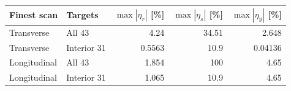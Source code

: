 \begin{tabular}{llrrr}
\toprule
Finest scan & Targets & $\max|\eta_r|$ [\%] & $\max|\eta_s|$ [\%] & $\max|\eta_y|$ [\%] \\
\midrule
Transverse & All 43 & 4.24 & 34.51 & 2.648 \\
Transverse & Interior 31 & 0.5563 & 10.9 & 0.04136 \\
Longitudinal & All 43 & 1.854 & 100 & 4.65 \\
Longitudinal & Interior 31 & 1.065 & 10.9 & 4.65 \\
\bottomrule
\end{tabular}
